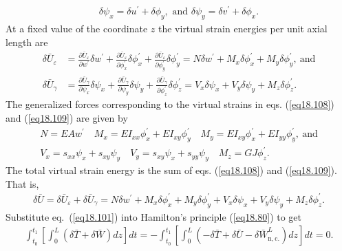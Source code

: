 \documentclass{AeroStructure-ERJohnson}
\begin{document}
\begin{align}\label{eq18.107}
\delta \psi_{x}=\delta u^{\prime}+\delta \phi_{y},\text{ and }\delta \psi_{y}=\delta v^{\prime}+\delta \phi_{x}.
\end{align}
 At a fixed value of the coordinate $z$ the virtual strain energies per unit axial length are
\begin{align}\label{eq18.108}
\delta \bar{U}_{\varepsilon}&=\frac{\partial \bar{U}_{\varepsilon}}{\partial w^{\prime}} \delta w^{\prime}+\frac{\partial \bar{U}_{\varepsilon}}{\partial \phi_{x}^{\prime}} \delta \phi_{x}^{\prime}+\frac{\partial \bar{U}_{\varepsilon}}{\partial \phi_{y}^{\prime}} \delta \phi_{y}^{\prime}=N \delta w^{\prime}+M_{x} \delta \phi_{x}^{\prime}+M_{y} \delta \phi_{y}^{\prime},\ \text{and}
\\\label{eq18.109}
\delta \bar{U}_{\gamma} &=\frac{\partial \bar{U}_{\gamma}}{\partial \psi_{x}} \delta \psi_{x}+\frac{\partial \bar{U}_{\gamma}}{\partial \psi_{y}} \delta \psi_{y}+\frac{\partial \bar{U}_{\gamma}}{\partial \phi_{z}^{\prime}} \delta \phi_{z}^{\prime}=V_{x} \delta \psi_{x}+V_{y} \delta \psi_{y}+M_{z} \delta \phi_{z}^{\prime}.
\end{align}
The generalized forces corresponding to the virtual strains in eqs. (\ref{eq18.108}) and (\ref{eq18.109}) are given by
\begin{align}\label{eq18.110}
N=E A w^{\prime} \quad M_{x}=E I_{x x} \phi_{x}^{\prime}+E I_{x y} \phi_{y}^{\prime} \quad M_{y}=E I_{x y} \phi_{x}^{\prime}+E I_{y y} \phi_{y}^{\prime},\ \text{and}\\
\label{eq18.111}
V_{x}=s_{x x} \psi_{x}+s_{x y} \psi_{y} \quad V_{y}=s_{x y} \psi_{x}+s_{y y} \psi_{y} \quad M_{z}=G J \phi_{z}^{\prime}.
\end{align}
The total virtual strain energy is the sum of eqs. (\ref{eq18.108}) and (\ref{eq18.109}). That is,
\begin{align}\label{eq18.112}
\delta \bar{U}=\delta \bar{U}_{\varepsilon}+\delta \bar{U}_{\gamma}=N \delta w^{\prime}+M_{x} \delta \phi_{x}^{\prime}+M_{y} \delta \phi_{y}^{\prime}+V_{x} \delta \psi_{x}+V_{y} \delta \psi_{y}+M_{z} \delta \phi_{z}^{\prime}.
\end{align}
Substitute eq.~(\ref{eq18.101}) into Hamilton's principle (\ref{eq18.80}) to get
\begin{align}\label{eq18.113}
\int_{t_{0}}^{t_{1}}\left[\int_{0}^{L}(\delta \bar{T}+\delta \bar{W}) d z\right] d t=-\int_{t_0}^{t_1}\left[\int_{0}^{L}\left(-\delta \bar{T}+\delta \bar{U}-\delta \bar{W}_{\mathrm{n}, \mathrm{c}.}^{L}\right) d z\right] d t=0.
\end{align}
\end{document}
